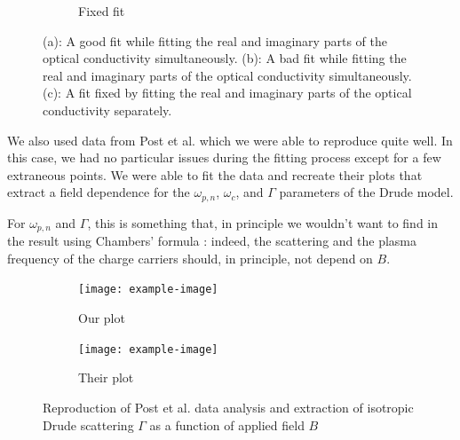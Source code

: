 \begin{figure}
\begin{subfigure}{0.49\textwidth}
        \caption{Fixed fit}
        \label{fig:drude_fit_bad}
    \end{subfigure}
    \caption{(a): A good fit while fitting the real and imaginary parts of the optical conductivity
    simultaneously. (b): A bad fit while fitting the real and imaginary parts of the optical
    conductivity simultaneously. (c): A fit fixed by fitting the real and imaginary parts of the
    optical conductivity separately.}
\end{figure}

We also used data from Post et al. which we were able to reproduce quite well. 
In this case, we had no particular issues during the fitting process except for a few extraneous points. 
We were able to fit the data and recreate their plots that extract a field dependence for the $\omega_{p,n}$, $\omega_c$, and $\Gamma$ parameters of the Drude model.

For $\omega_{p,n}$ and $\Gamma$, this is something that, in principle we wouldn't want to find in the result using Chambers' formula : 
indeed, the scattering and the plasma frequency of the charge carriers should, 
in principle, not depend on $B$.

\begin{figure}
\centering
\begin{subfigure}{0.45\textwidth}
    \texttt{[image: example-image]}
    \caption{Our plot}
    \label{fig:gamma_extraction_ours}
\end{subfigure}
\hfill
\begin{subfigure}{0.45\textwidth}
    \texttt{[image: example-image]}
    \caption{Their plot}
    \label{fig:gamma_extraction_theirs}
\end{subfigure}
        
\caption{Reproduction of Post et al. data analysis and extraction of isotropic Drude scattering $\Gamma$ as a function of applied field $B$}
\label{fig:reproduction_post}
\end{figure}
